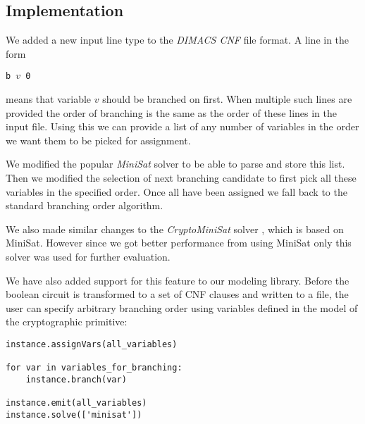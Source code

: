 \subsection{Implementation}
\label{sec:branching-order-impl}
We added a new input line type to the \emph{DIMACS CNF} file format.
A line in the form

\centerline{\texttt{b $v$ 0}}

\noindent means that variable $v$ should be branched on first.
When multiple such lines are provided the order of branching is the same as the order of these lines in the input file.
Using this we can provide a list of any number of variables in the order we want them to be picked for assignment.

We modified the popular \emph{MiniSat} solver \cite{een2005minisat} to be able to parse and store this list.
Then we modified the selection of next branching candidate to first pick all these variables in the specified order.
Once all have been assigned we fall back to the standard branching order algorithm.

We also made similar changes to the \emph{CryptoMiniSat} solver \cite{soos2009extending}, which is based on MiniSat.
However since we got better performance from using MiniSat only this solver was used for further evaluation.

We have also added support for this feature to our modeling library.
Before the boolean circuit is transformed to a set of CNF clauses and written to a file, the user can specify arbitrary branching order using variables defined in the model of the cryptographic primitive:

\begin{verbatim}
instance.assignVars(all_variables)

for var in variables_for_branching:
    instance.branch(var)

instance.emit(all_variables)
instance.solve(['minisat'])
\end{verbatim}